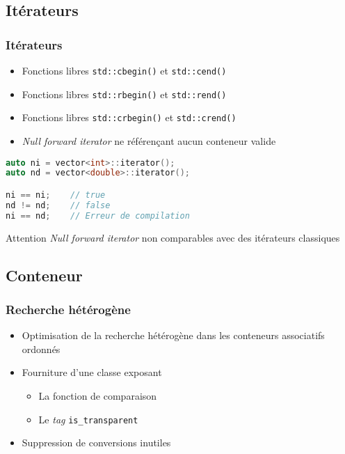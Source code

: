 \documentclass[C++.tex]{subfiles}
\begin{document}
\subsection*{Itérateurs}
\begin{frame}[fragile]
	\frametitle{Itérateurs}
	\begin{itemize}
		\item Fonctions libres \lstinline|std::cbegin()| et \lstinline|std::cend()|
		\item Fonctions libres \lstinline|std::rbegin()| et \lstinline|std::rend()|
		\item Fonctions libres \lstinline|std::crbegin()| et \lstinline|std::crend()|
		\item \textit{Null forward iterator} ne référençant aucun conteneur valide
	\end{itemize}

	\begin{lstlisting}[language=C++]
auto ni = vector<int>::iterator();
auto nd = vector<double>::iterator();

ni == ni;    // true
nd != nd;    // false
ni == nd;    // Erreur de compilation\end{lstlisting}

	\begin{alertblock}{Attention}
		\textit{Null forward iterator} non comparables avec des itérateurs \og classiques\fg{}

	\end{alertblock}
\end{frame}

\subsection*{Conteneur}
\begin{frame}[fragile]
	\frametitle{Recherche hétérogène}
	\begin{itemize}
		\item Optimisation de la recherche hétérogène dans les conteneurs associatifs ordonnés
		\item Fourniture d'une classe exposant
		\begin{itemize}
			\item La fonction de comparaison
			\item Le \textit{tag} \lstinline|is_transparent|
		\end{itemize}
		\item Suppression de conversions inutiles
	\end{itemize}
\end{frame}
\end{document}
